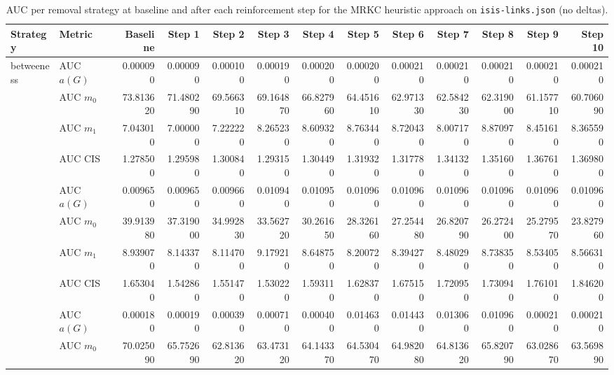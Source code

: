 \begin{table}[htbp]
  \centering
  \caption{AUC per removal strategy at baseline and after each reinforcement step for the MRKC heuristic approach on \texttt{isis-links.json} (no deltas).}
  \label{tab:isis-links-mrkc_heuristic-auc}
\setlength{\tabcolsep}{2.5pt}
  \begin{tabular}{llrrrrrrrrrrr}
    \toprule
    \textbf{Strategy} & \textbf{Metric} & \textbf{Baseline} & \textbf{Step 1} & \textbf{Step 2} & \textbf{Step 3} & \textbf{Step 4} & \textbf{Step 5} & \textbf{Step 6} & \textbf{Step 7} & \textbf{Step 8} & \textbf{Step 9} & \textbf{Step 10} \\
    \midrule
    \multirow{4}{*}{betweeness} & AUC $a(G)$ & 0.000090 & 0.000090 & 0.000100 & 0.000190 & 0.000200 & 0.000200 & 0.000210 & 0.000210 & 0.000210 & 0.000210 & 0.000210 \\
    & AUC $m_0$ & 73.813620 & 71.480290 & 69.566310 & 69.164870 & 66.827960 & 64.451610 & 62.971330 & 62.584230 & 62.319000 & 61.157710 & 60.706090 \\
    & AUC $m_1$ & 7.043010 & 7.000000 & 7.222220 & 8.265230 & 8.609320 & 8.763440 & 8.720430 & 8.007170 & 8.870970 & 8.451610 & 8.365590 \\
    & AUC CIS & 1.278500 & 1.295980 & 1.300840 & 1.293150 & 1.304490 & 1.319320 & 1.317780 & 1.341320 & 1.351600 & 1.367610 & 1.369800 \\
    \addlinespace
    \multirow{4}{*}{closeness} & AUC $a(G)$ & 0.009650 & 0.009650 & 0.009660 & 0.010940 & 0.010950 & 0.010960 & 0.010960 & 0.010960 & 0.010960 & 0.010960 & 0.010960 \\
    & AUC $m_0$ & 39.913980 & 37.319000 & 34.992830 & 33.562720 & 30.261650 & 28.326160 & 27.254480 & 26.820790 & 26.272400 & 25.279570 & 23.827960 \\
    & AUC $m_1$ & 8.939070 & 8.143370 & 8.114700 & 9.179210 & 8.648750 & 8.200720 & 8.394270 & 8.480290 & 8.738350 & 8.534050 & 8.566310 \\
    & AUC CIS & 1.653040 & 1.542860 & 1.551470 & 1.530220 & 1.593110 & 1.628370 & 1.675150 & 1.720950 & 1.730940 & 1.761010 & 1.846200 \\
    \addlinespace
    \multirow{4}{*}{core influence} & AUC $a(G)$ & 0.000180 & 0.000190 & 0.000390 & 0.000710 & 0.000400 & 0.014630 & 0.014430 & 0.013060 & 0.010960 & 0.000210 & 0.000210 \\
    & AUC $m_0$ & 70.025090 & 65.752690 & 62.813620 & 63.473120 & 64.143370 & 64.530470 & 64.982080 & 64.813620 & 65.820790 & 63.028670 & 63.569890 \\

\end{tabular}
\end{table}

